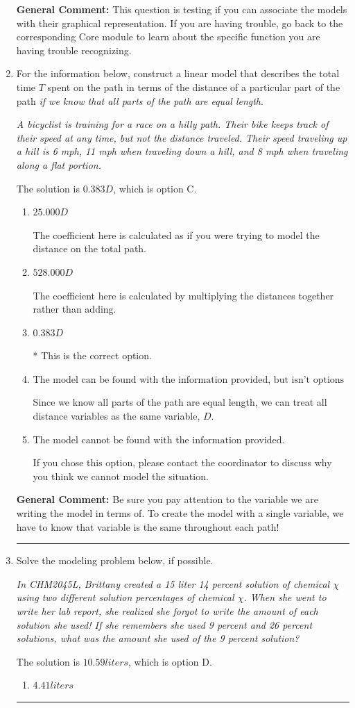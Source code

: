 \documentclass{extbook}[14pt]
\newcommand{\litem}[1]{\item #1

\rule{\textwidth}{0.4pt}}
\begin{document}
\begin{enumerate}
{\textbf{General Comment:} This question is testing if you can associate the models with their graphical representation. If you are having trouble, go back to the corresponding Core module to learn about the specific function you are having trouble recognizing.
}
\litem{
For the information below, construct a linear model that describes the total time $T$ spent on the path in terms of the distance of a particular part of the path \textit{if we know that all parts of the path are equal length}.

\begin{center}
    \textit{ A bicyclist is training for a race on a hilly path. Their bike keeps track of their speed at any time, but not the distance traveled. Their speed traveling up a hill is 6 mph, 11 mph when traveling down a hill, and 8 mph when traveling along a flat portion. }
\end{center}
The solution is \( 0.383 D \), which is option C.\begin{enumerate}[label=\Alph*.]
\item \( 25.000 D \)

The coefficient here is calculated as if you were trying to model the distance on the total path.
\item \( 528.000 D \)

The coefficient here is calculated by multiplying the distances together rather than adding.
\item \( 0.383 D \)

* This is the correct option.
\item \( \text{The model can be found with the information provided, but isn't options 1-3.} \)

Since we know all parts of the path are equal length, we can treat all distance variables as the same variable, $D$.
\item \( \text{The model cannot be found with the information provided.} \)

If you chose this option, please contact the coordinator to discuss why you think we cannot model the situation.
\end{enumerate}

\textbf{General Comment:} Be sure you pay attention to the variable we are writing the model in terms of. To create the model with a single variable, we have to know that variable is the same throughout each path!
}
\litem{
Solve the modeling problem below, if possible.

\begin{center}
    \textit{ In CHM2045L, Brittany created a 15 liter 14 percent solution of chemical $\chi$ using two different solution percentages of chemical $\chi$. When she went to write her lab report, she realized she forgot to write the amount of each solution she used! If she remembers she used 9 percent and 26 percent solutions, what was the amount she used of the 9 percent solution? }
\end{center}
The solution is \( 10.59 liters \), which is option D.\begin{enumerate}[label=\Alph*.]
\item \( 4.41 liters \)


\end{enumerate}}
\end{enumerate}
\end{document}
